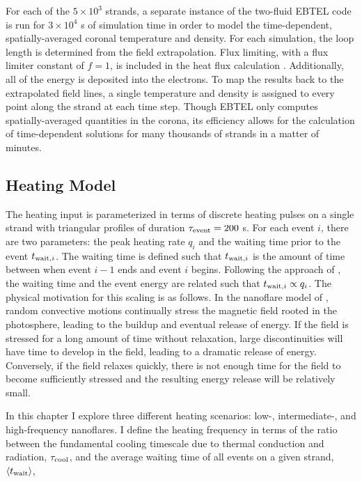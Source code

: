 For each of the $5\times10^3$ strands, a separate instance of the two-fluid EBTEL code is run for $3\times10^4$ s of simulation time in order to model the time-dependent, spatially-averaged coronal temperature and density. For each simulation, the loop length is determined from the field extrapolation. Flux limiting, with a flux limiter constant of $f=1$, is included in the heat flux calculation \citep[see Eqs. 21 and 22 of][and \autoref{hot-plasma:subsec:hf_theory}]{klimchuk_highly_2008}. Additionally, all of the energy is deposited into the electrons. To map the results back to the extrapolated field lines, a single temperature and density is assigned to every point along the strand at each time step. Though EBTEL only computes spatially-averaged quantities in the corona, its efficiency allows for the calculation of time-dependent solutions for many thousands of strands in a matter of minutes.

\subsection{Heating Model}\label{sec:modeling-observables:heating}

The heating input is parameterized in terms of discrete heating pulses on a single strand with triangular profiles of duration $\tau_{\textup{event}}=200$ s. For each event $i$, there are two parameters: the peak heating rate $q_i$ and the waiting time prior to the event $\twait[,i]$. The waiting time is defined such that $\twait[,i]$ is the amount of time between when event $i-1$ ends and event $i$ begins. Following the approach of \citet{cargill_active_2014}, the waiting time and the event energy are related such that $\twait[,i]\propto q_i$. The physical motivation for this scaling is as follows. In the nanoflare model of \citet{parker_nanoflares_1988}, random convective motions continually stress the magnetic field rooted in the photosphere, leading to the buildup and eventual release of energy. If the field is stressed for a long amount of time without relaxation, large discontinuities will have time to develop in the field, leading to a dramatic release of energy. Conversely, if the field relaxes quickly, there is not enough time for the field to become sufficiently stressed and the resulting energy release will be relatively small. 

In this chapter I explore three different heating scenarios: low-, intermediate-, and high-frequency nanoflares. I define the heating frequency in terms of the ratio between the fundamental cooling timescale due to thermal conduction and radiation, $\tau_{\textup{cool}}$, and the average waiting time of all events on a given strand, $\langle \twait\rangle$,

